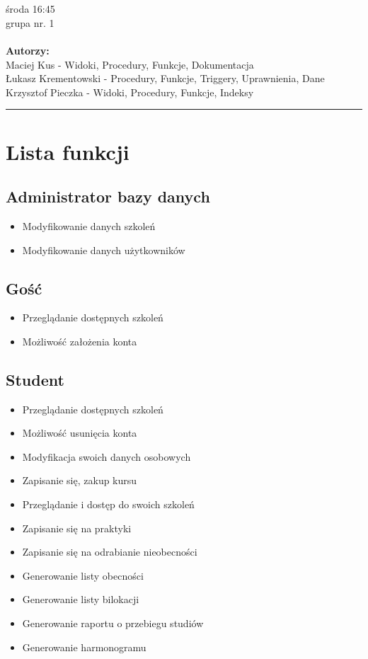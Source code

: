 \documentclass[11pt,a4paper]{article}
\begin{document}
  \\\\
\noindent środa 16:45 \\
\noindent grupa nr. 1 \\\\
\textbf{Autorzy:}\\Maciej Kus - Widoki, Procedury, Funkcje, Dokumentacja\\Łukasz Krementowski - Procedury, Funkcje, Triggery, Uprawnienia, Dane\\Krzysztof Pieczka - Widoki, Procedury, Funkcje, Indeksy\\
\hrule

\section{Lista funkcji}

\subsection{Administrator bazy danych}
\begin{itemize}
    \item Modyfikowanie danych szkoleń
    \item Modyfikowanie danych użytkowników
\end{itemize}

\subsection{Gość}
\begin{itemize}
    \item Przeglądanie dostępnych szkoleń
    \item Możliwość założenia konta
\end{itemize}

\subsection{Student}
\begin{itemize}
    \item Przeglądanie dostępnych szkoleń
    \item Możliwość usunięcia konta
    \item Modyfikacja swoich danych osobowych
    \item Zapisanie się, zakup kursu
    \item Przeglądanie i dostęp do swoich szkoleń
    \item Zapisanie się na praktyki
    \item Zapisanie się na odrabianie nieobecności 
    \item Generowanie listy obecności
    \item Generowanie listy bilokacji
    \item Generowanie raportu o przebiegu studiów
    \item Generowanie harmonogramu
\end{itemize}
\end{document}
